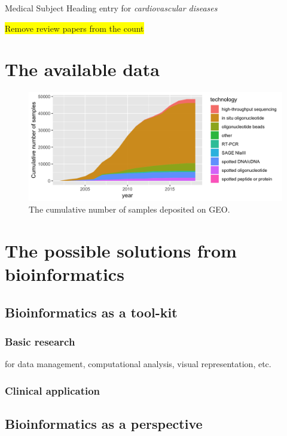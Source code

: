 \documentclass{bioinfo}
\newcommand{\todo}[1]{\colorbox{yellow}{#1}}
\begin{document}
Medical Subject Heading entry for \textit{cardiovascular diseases}

\todo{Remove review papers from the count}

\section{The available data}

\begin{figure}[!tpb]%
\includegraphics[width=1\linewidth]{gsm_count_by_tech.png}
	\caption{The cumulative number of samples deposited on GEO.}\label{fig:01}
\end{figure}

\section{The possible solutions from bioinformatics}
\subsection{Bioinformatics as a tool-kit}
\subsubsection{Basic research}
for data management, computational analysis, visual representation, etc.

\subsubsection{Clinical application}


\subsection{Bioinformatics as a perspective}
\end{document}
